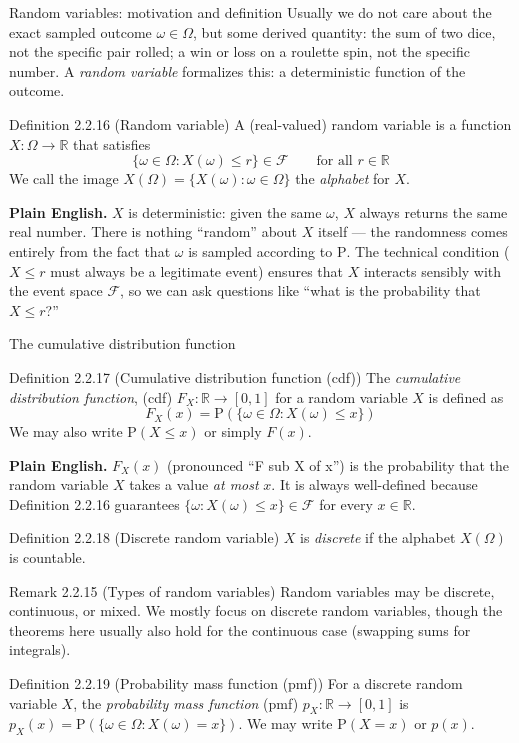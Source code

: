 \documentclass[aspectratio=169,10pt]{beamer}
\begin{document}
\begin{frame}{Random variables: motivation and definition}
Usually we do not care about the exact sampled outcome $\omega\in\Omega$, but
some derived quantity: the sum of two dice, not the specific pair rolled; a
win or loss on a roulette spin, not the specific number. A \emph{random
variable} formalizes this: a deterministic function of the outcome.

\begin{block}{Definition 2.2.16 (Random variable)}
A (real-valued) random variable is a function $X:\Omega\to\mathbb{R}$ that
satisfies
\[ \{\omega\in\Omega : X(\omega)\leq r\} \in \mathcal{F} \qquad \text{for all } r\in\mathbb{R} \]
We call the image $X(\Omega)=\{X(\omega):\omega\in\Omega\}$ the
\emph{alphabet} for $X$.
\end{block}
\textbf{Plain English.} $X$ is deterministic: given the same $\omega$, $X$
always returns the same real number. There is nothing ``random'' about $X$
itself --- the randomness comes entirely from the fact that $\omega$ is
sampled according to $\mathrm{P}$. The technical condition ($X\leq r$ must
always be a legitimate event) ensures that $X$ interacts sensibly with the
event space $\mathcal{F}$, so we can ask questions like ``what is the
probability that $X\leq r$?''
\end{frame}

\begin{frame}{The cumulative distribution function}
\begin{block}{Definition 2.2.17 (Cumulative distribution function (cdf))}
The \emph{cumulative distribution function}, (cdf) $F_X:\mathbb{R}\to[0,1]$
for a random variable $X$ is defined as
\[ F_X(x) = \mathrm{P}(\{\omega\in\Omega : X(\omega)\leq x\}) \]
We may also write $\mathrm{P}(X\leq x)$ or simply $F(x)$.
\end{block}
\textbf{Plain English.} $F_X(x)$ (pronounced ``F sub X of x'') is the
probability that the random variable $X$ takes a value \emph{at most} $x$.
It is always well-defined because Definition 2.2.16 guarantees
$\{\omega:X(\omega)\leq x\}\in\mathcal{F}$ for every $x\in\mathbb{R}$.

\begin{block}{Definition 2.2.18 (Discrete random variable)}
$X$ is \emph{discrete} if the alphabet $X(\Omega)$ is countable.
\end{block}

\begin{block}{Remark 2.2.15 (Types of random variables)}
Random variables may be discrete, continuous, or mixed. We mostly focus on
discrete random variables, though the theorems here usually also hold for
the continuous case (swapping sums for integrals).
\end{block}

\begin{block}{Definition 2.2.19 (Probability mass function (pmf))}
For a discrete random variable $X$, the \emph{probability mass function}
(pmf) $p_X:\mathbb{R}\to[0,1]$ is $p_X(x) = \mathrm{P}(\{\omega\in\Omega : X(\omega)=x\})$.
We may write $\mathrm{P}(X=x)$ or $p(x)$.
\end{block}
\end{frame}
\end{document}
